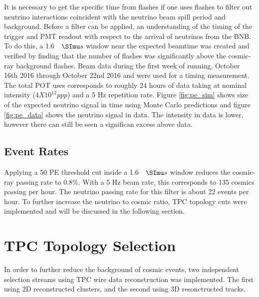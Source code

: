 It is necessary to get the specific time from flashes if one uses flashes to filter out neutrino interactions coincident with the neutrino beam spill period and background. Before a filter can be applied, an understanding of the timing of the trigger and PMT readout with respect to the arrival of neutrinos from the BNB. To do this, a 1.6 $\micro s$ window near the expected beamtime was created and verified by finding that the number of flashes was significantly above the cosmic-ray background flashes. Beam data during the first week of running, October 16th 2016 through October 22nd 2016 and were used for a timing measurement. The total POT uses corresponds to roughly 24 hours of data taking at nominal intensity ($4 X 10^{12} ppp$) and a 5 Hz repetition rate. Figure \ref{fig:pe_sim} shows size of the expected neutrino signal in time using Monte Carlo predictions and figure \ref{fig:pe_data} shows the neutrino signal in data. The intensity in data is lower, however there can still be seen a significan excess above data.

\subsection{Event Rates}
Applying a 50 PE threshold cut inside a 1.6 $\micro s$ window reduces the cosmic-ray passing rate to 0.8\%. With a 5 Hz beam rate, this corresponds to 135 cosmics passing per hour. The neutrino passing rate for this filter is about 22 events per hour. To further increase the neutrino to cosmic ratio, TPC topology cuts were implemented and will be discussed in the following section.
\section{TPC Topology Selection}  
In order to further reduce the background of cosmic events, two independent selection streams using TPC wire data reconstruction was implemented. The first using 2D reconstructed clusters, and the second using 3D resonctructed tracks.
